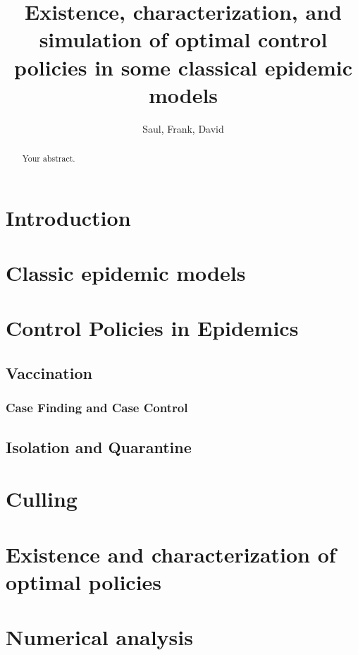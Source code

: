 \documentclass[a4paper]{amsart}
\title[%
	Existence, characterization and simulation of OCP for some epidemic 
	Models%
	]{
	Existence, characterization, and simulation
	of optimal control policies in some classical epidemic models
}
\author{Saul, Frank, David}
\begin{document}
	\maketitle
  \begin{abstract}
  	Your abstract.
  \end{abstract}
%
%
  \section{Introduction}
    
  \section{Classic epidemic models}
    
  \section{Control Policies in Epidemics}
    
    \subsection{Vaccination}
      
    \subsubsection{Case Finding and Case Control}
      
    \subsection{Isolation and Quarantine}
      
    \section{Culling}
      
  \section{Existence and characterization of optimal policies}
    
%
%
  \section{Numerical analysis}
    
\end{document}
